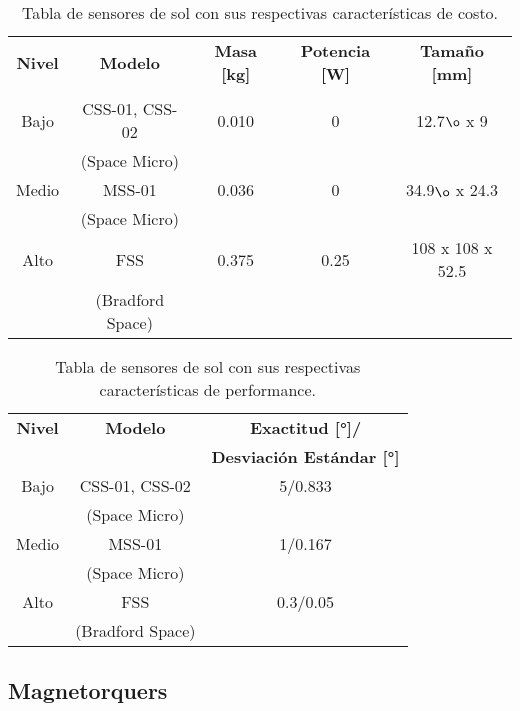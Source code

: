 \begin{table}[H]
	\centering
	\caption{Tabla de sensores de sol con sus respectivas características de costo.}
	\begin{tabular}{|c|c|c|c|c|}
		\hline
		\textbf{Nivel} & \textbf{Modelo} & \textbf{Masa [kg]} & \textbf{Potencia [W]} & \textbf{Tamaño [mm]}  \\
		& &  &  &   \\ \hline
		Bajo & CSS-01, CSS-02 \cite{ref53} & 0.010  & 0 & 12.7$\o$ x 9 \\
		& (Space Micro) &  &  &  \\ \hline
		Medio & MSS-01 \cite{ref54}& 0.036 & 0 &  34.9$\o$ x 24.3  \\
		& (Space Micro) & &  &  \\ \hline
		Alto & FSS \cite{ref55}& 0.375 & 0.25 & 108 x 108 x 52.5  \\
		& (Bradford Space) & &  &   \\ \hline
	\end{tabular}
	
\end{table}

\begin{table}[H]
	\centering
	\caption{Tabla de sensores de sol con sus respectivas características de performance.}
	\begin{tabular}{|c|c|c|}
		\hline
		\textbf{Nivel} & \textbf{Modelo} & \textbf{Exactitud [°]/}  \\
		& & \textbf{Desviación Estándar [°]}   \\ \hline
		Bajo & CSS-01, CSS-02 & 5/0.833  \\
		& (Space Micro) &   \\ \hline
		Medio & MSS-01 & 1/0.167  \\
		& (Space Micro) &   \\ \hline
		Alto & FSS & 0.3/0.05   \\
		& (Bradford Space) &    \\ \hline
	\end{tabular}
	
\end{table}


\subsection{Magnetorquers}



